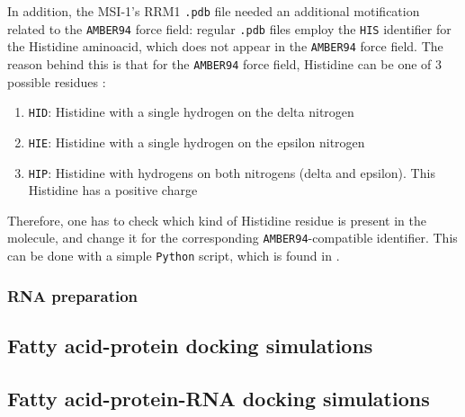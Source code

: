 In addition, the MSI-1's RRM1 \texttt{.pdb} file needed an additional motification related to the \texttt{AMBER94} force field: regular \texttt{.pdb} files employ the \texttt{HIS} identifier for the Histidine aminoacid, which does not appear in the \texttt{AMBER94} force field. The reason behind this is that for the \texttt{AMBER94} force field, Histidine can be one of 3 possible residues \cite{amber_histidine}:

\begin{enumerate}
    \item\texttt{HID}: Histidine with a single hydrogen on the delta nitrogen
    \item\texttt{HIE}: Histidine with a single hydrogen on the epsilon nitrogen
    \item\texttt{HIP}: Histidine with hydrogens on both nitrogens (delta and epsilon). This Histidine has a positive charge
\end{enumerate}

Therefore, one has to check which kind of Histidine residue is present in the molecule, and change it for the corresponding \texttt{AMBER94}-compatible identifier. This can be done with a simple \texttt{Python} script, which is found in \textbf{}.

\subsubsection{RNA preparation}


\subsection{Fatty acid-protein docking simulations}
\subsection{Fatty acid-protein-RNA docking simulations}




    
